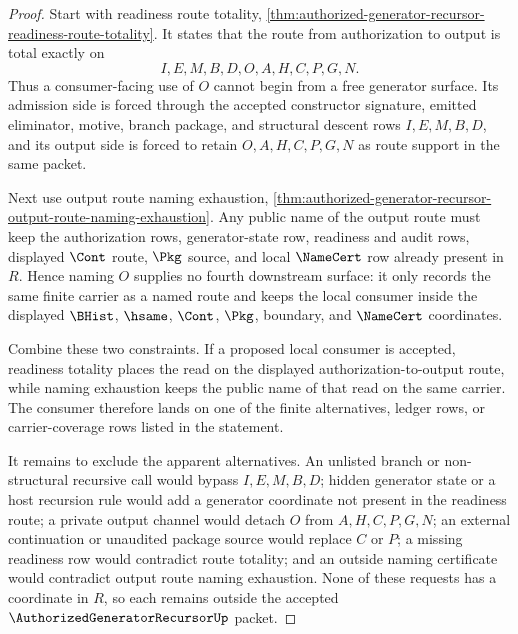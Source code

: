 \begin{proof}
Start with readiness route totality, \autoref{thm:authorized-generator-recursor-readiness-route-totality}. It states that the route from authorization to output is total exactly on
$$
I,E,M,B,D,O,A,H,C,P,G,N.
$$
Thus a consumer-facing use of $O$ cannot begin from a free generator surface. Its admission side is forced through the accepted constructor signature, emitted eliminator, motive, branch package, and structural descent rows $I,E,M,B,D$, and its output side is forced to retain $O,A,H,C,P,G,N$ as route support in the same packet.

Next use output route naming exhaustion, \autoref{thm:authorized-generator-recursor-output-route-naming-exhaustion}. Any public name of the output route must keep the authorization rows, generator-state row, readiness and audit rows, displayed $\Cont$ route, $\Pkg$ source, and local $\NameCert$ row already present in $R$. Hence naming $O$ supplies no fourth downstream surface: it only records the same finite carrier as a named route and keeps the local consumer inside the displayed $\BHist$, $\hsame$, $\Cont$, $\Pkg$, boundary, and $\NameCert$ coordinates.

Combine these two constraints. If a proposed local consumer is accepted, readiness totality places the read on the displayed authorization-to-output route, while naming exhaustion keeps the public name of that read on the same carrier. The consumer therefore lands on one of the finite alternatives, ledger rows, or carrier-coverage rows listed in the statement.

It remains to exclude the apparent alternatives. An unlisted branch or non-structural recursive call would bypass $I,E,M,B,D$; hidden generator state or a host recursion rule would add a generator coordinate not present in the readiness route; a private output channel would detach $O$ from $A,H,C,P,G,N$; an external continuation or unaudited package source would replace $C$ or $P$; a missing readiness row would contradict route totality; and an outside naming certificate would contradict output route naming exhaustion. None of these requests has a coordinate in $R$, so each remains outside the accepted $\AuthorizedGeneratorRecursorUp$ packet.
\end{proof}
